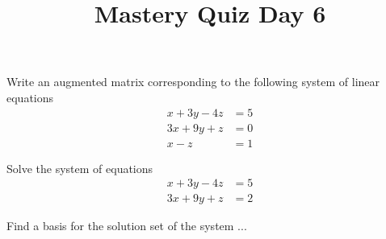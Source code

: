 \documentclass{sbgquiz}
\title{Mastery Quiz Day 6 }
\begin{document}
\begin{problem}[E1]
Write an augmented matrix corresponding to the following system of linear equations
\begin{align*}
x+3y-4z &= 5 \\
3x+9y+z &= 0 \\
x-z &= 1
\end{align*}
\end{problem}

\begin{problem}[E3]
Solve the system of equations
\begin{align*}
x+3y-4z &= 5 \\
3x+9y+z &= 2
\end{align*}
\end{problem}

\begin{problem}[E4]
Find a basis for the solution set of the system ...
\end{problem}
\end{document}

